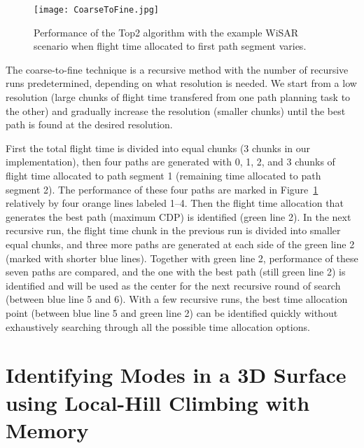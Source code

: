 

\begin{figure}
\centering
\texttt{[image: CoarseToFine.jpg]}
\caption{Performance of the Top2 algorithm with the example WiSAR scenario when flight time allocated to first path segment varies.}
\label{CoarseToFine}
\end{figure}

The coarse-to-fine technique is a recursive method with the number of recursive runs predetermined, depending on what resolution is needed. We start from a low resolution (large chunks of flight time transfered from one path planning task to the other) and gradually increase the resolution (smaller chunks) until the best path is found at the desired resolution. 

First the total flight time is divided into equal chunks (3 chunks in our implementation), then four paths are generated with 0, 1, 2, and 3 chunks of flight time allocated to path segment 1 (remaining time allocated to path segment 2). The performance of these four paths are marked in Figure~\ref{CoarseToFine} relatively by four orange lines labeled 1--4. Then the flight time allocation that generates the best path (maximum CDP) is identified (green line 2). In the next recursive run, the flight time chunk in the previous run is divided into smaller equal chunks, and three more paths are generated at each side of the green line 2 (marked with shorter blue lines). Together with green line 2, performance of these seven paths are compared, and the one with the best path (still green line 2) is identified and will be used as the center for the next recursive round of search (between blue line 5 and 6). With a few recursive runs, the best time allocation point (between blue line 5 and green line 2) can be identified quickly without exhaustively searching through all the possible time allocation options.




\chapter{Identifying Modes in a 3D Surface using Local-Hill Climbing with Memory}
\label{chap:modes}


